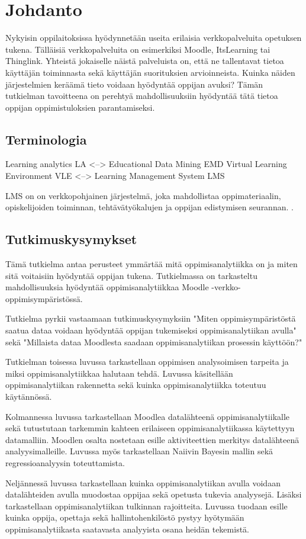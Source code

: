 \chapter{Johdanto\label{johdanto}}

Nykyisin oppilaitoksissa hyödynnetään useita erilaisia verkkopalveluita opetuksen tukena. Tälläisiä verkkopalveluita on esimerkiksi Moodle, ItsLearning tai Thinglink. Yhteistä jokaiselle näistä palveluista on, että ne tallentavat tietoa käyttäjän toiminnasta sekä käyttäjän suorituksien arvioinneista. Kuinka näiden järjestelmien keräämä tieto voidaan hyödyntää oppijan avuksi? Tämän tutkielman tavoitteena on perehtyä mahdollisuuksiin hyödyntää tätä tietoa oppijan oppimistuloksien parantamiseksi.


\section{Terminologia}

Learning analytics LA <--> Educational Data Mining EMD \citep{romeroEducationalDataMining2010}
Virtual Learning Environment VLE <--> Learning Management System LMS

LMS on on verkkopohjainen järjestelmä, joka mahdollistaa oppimateriaalin, opiskelijoiden toiminnan, tehtävätyökalujen ja oppijan edistymisen seurannan. \citep{mohdChoosingRightLearning2016}. \citep{romeroSurveyPreProcessingEducational2014}
\color{black}

\section{Tutkimuskysymykset}
Tämä tutkielma antaa perusteet ymmärtää mitä oppimisanalytiikka on ja miten sitä voitaisiin hyödyntää oppijan tukena. Tutkielmassa on tarkasteltu mahdollisuuksia hyödyntää oppimisanalytiikkaa Moodle -verkko-oppimisympäristössä.

Tutkielma pyrkii vastaamaan tutkimuskysymyksiin "Miten oppimisympäristöstä saatua dataa voidaan hyödyntää oppijan tukemiseksi oppimisanalytiikan avulla" sekä "Millaista dataa Moodlesta saadaan oppimisanalytiikan prosessin käyttöön?"

Tutkielman toisessa luvussa tarkastellaan oppimisen analysoimisen tarpeita ja miksi oppimisanalytiikkaa halutaan tehdä. Luvussa käsitellään oppimisanalytiikan rakennetta sekä kuinka oppimisanalytiikka toteutuu käytännössä.

Kolmannessa luvussa tarkastellaan Moodlea datalähteenä oppimisanalytiikalle sekä tutustutaan tarkemmin kahteen erilaiseen oppimisanalytiikassa käytettyyn datamalliin. Moodlen osalta nostetaan esille aktiviteettien merkitys datalähteenä analyysimalleille. Luvussa myös tarkastellaan Naiivin Bayesin mallin sekä regressioanalyysin toteuttamista.

Neljännessä luvussa tarkastellaan kuinka oppimisanalytiikan avulla voidaan datalähteiden avulla muodostaa oppijaa sekä opetusta tukevia analyysejä. Lisäksi tarkastellaan oppimisanalytiikan tulkinnan rajoitteita. Luvussa tuodaan esille kuinka oppija, opettaja sekä hallintohenkilöstö pystyy hyötymään oppimisanalytiikasta saatavasta analyyista osana heidän tekemistä.